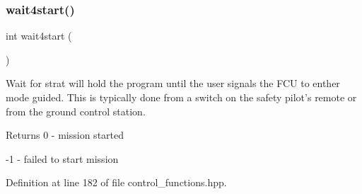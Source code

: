 \mbox{\label{group__control__functions_gab6fe46f505ab9804b4ed98b96286a811}} 
\subsubsection{\texorpdfstring{wait4start()}{wait4start()}}
{\footnotesize\ttfamily int wait4start (\begin{DoxyParamCaption}{ }\end{DoxyParamCaption})}

Wait for strat will hold the program until the user signals the F\+CU to enther mode guided. This is typically done from a switch on the safety pilot’s remote or from the ground control station. \begin{DoxyReturn}{Returns}
0 -\/ mission started 

-\/1 -\/ failed to start mission 
\end{DoxyReturn}


Definition at line 182 of file control\+\_\+functions.\+hpp.

